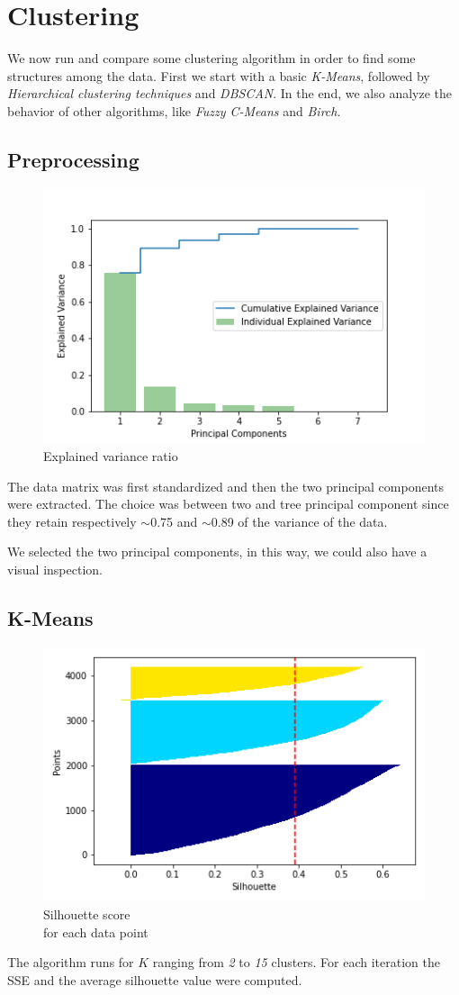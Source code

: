 \section{Clustering}
We now run and compare some clustering algorithm in order to find some structures among the data. First we start with a basic \emph{K-Means}, followed by \emph{Hierarchical clustering techniques} and \emph{DBSCAN}. In the end, we also analyze the behavior of other algorithms, like \emph{Fuzzy C-Means} and \emph{Birch}.

\subsection{Preprocessing}

\begin{figure}
\vspace{-20mm}
\centering
\captionsetup{justification=centering}
\includegraphics[width=.35\textwidth]{img/clustering/pca.png}
\caption{Explained variance ratio}
\label{fig:pca_img}
\end{figure}

The data matrix was first standardized and then the two principal components were extracted. The choice was between two and tree principal component since they retain respectively $\sim$0.75 and $\sim$0.89 of the variance of the data.

We selected the two principal components, in this way, we could also have a visual inspection.

\subsection{K-Means}
\begin{figure}
    \centering
    \captionsetup{justification=centering}
    \includegraphics[width=.3\textwidth]{img/clustering/sil_tot.png}
    \caption{Silhouette score\\ for each data point}
    \label{fig:silhouette}
\end{figure}
The algorithm runs for $K$ ranging from \emph{2} to \emph{15} clusters. For each iteration the SSE and the average silhouette value were computed.

